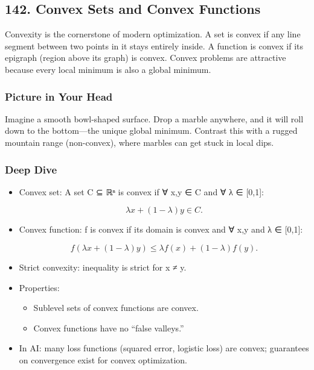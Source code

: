 \documentclass[
  letterpaper,
  DIV=11,
  numbers=noendperiod]{scrreprt}
\providecommand{\tightlist}{%
  \setlength{\itemsep}{0pt}\setlength{\parskip}{0pt}}
\begin{document}
\subsection{142. Convex Sets and Convex
Functions}\label{convex-sets-and-convex-functions}

Convexity is the cornerstone of modern optimization. A set is convex if
any line segment between two points in it stays entirely inside. A
function is convex if its epigraph (region above its graph) is convex.
Convex problems are attractive because every local minimum is also a
global minimum.

\subsubsection{Picture in Your Head}\label{picture-in-your-head-141}

Imagine a smooth bowl-shaped surface. Drop a marble anywhere, and it
will roll down to the bottom---the unique global minimum. Contrast this
with a rugged mountain range (non-convex), where marbles can get stuck
in local dips.

\subsubsection{Deep Dive}\label{deep-dive-141}

\begin{itemize}
\item
  Convex set: A set C ⊆ ℝⁿ is convex if ∀ x,y ∈ C and ∀ λ ∈ {[}0,1{]}:

  \[
  λx + (1−λ)y ∈ C.
  \]
\item
  Convex function: f is convex if its domain is convex and ∀ x,y and λ ∈
  {[}0,1{]}:

  \[
  f(λx + (1−λ)y) ≤ λf(x) + (1−λ)f(y).
  \]
\item
  Strict convexity: inequality is strict for x ≠ y.
\item
  Properties:

  \begin{itemize}
  \tightlist
  \item
    Sublevel sets of convex functions are convex.
  \item
    Convex functions have no ``false valleys.''
  \end{itemize}
\item
  In AI: many loss functions (squared error, logistic loss) are convex;
  guarantees on convergence exist for convex optimization.
\end{itemize}
\end{document}
